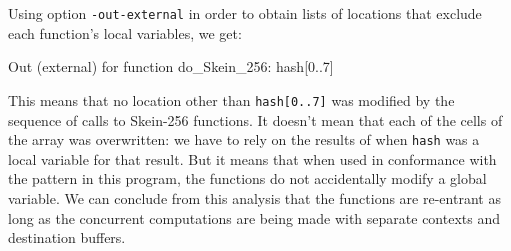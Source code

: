 \documentclass{frama-c-book}
\begin{document}
Using option \verb|-out-external| in order to obtain lists of
locations that exclude each function's local variables, we get:
\begin{logs}
[inout] Out (external) for function do_Skein_256:
          hash[0..7]
\end{logs}
This means that no location other than \lstinline|hash[0..7]| was
modified by the sequence of calls to Skein-256 functions. It doesn't
mean that each of the cells of the array was overwritten: we have to
rely on the results of \Eva{} when \lstinline|hash| was a
local variable for that result. But it means that when used in
conformance with the pattern in this program, the functions do not
accidentally modify a global variable. We can conclude from this
analysis that the functions are re-entrant as long as the concurrent
computations are being made with separate contexts and destination
buffers.
\end{document}
